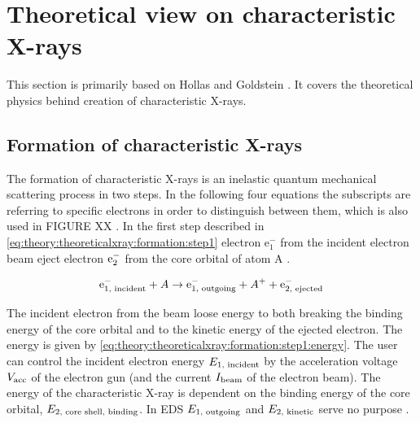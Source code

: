

\section{Theoretical view on characteristic X-rays}
\label{sec:theory:theoreticalxray}


This section is primarily based on Hollas \cite[Ch. 8.2]{hollas_modern_2004} and Goldstein \cite[Ch. 4.2]{goldstein_scanning_2018}.
It covers the theoretical physics behind creation of characteristic X-rays.

%
%
\subsection{Formation of characteristic X-rays}
\label{sec:theory:theoreticalxray:formation}
The formation of characteristic X-rays is an inelastic quantum mechanical scattering process in two steps.
In the following four equations the subscripts are referring to specific electrons in order to distinguish between them, which is also used in FIGURE XX .
In the first step described in \cref{eq:theory:theoreticalxray:formation:step1} electron e$^-_{1}$ from the incident electron beam eject electron $\textnormal{e}^-_{2}$ from the core orbital of atom A \cite[Eq. (8.12)]{hollas_modern_2004}.

\begin{equation}
    \label{eq:theory:theoreticalxray:formation:step1}
    \textnormal{e}^-_{1 \textnormal{, incident}} + A \rightarrow \textnormal{e}^-_{1 \textnormal{, outgoing}} + A^+ + \textnormal{e}^-_{2 \textnormal{, ejected}}
\end{equation}


The incident electron from the beam loose energy to both breaking the binding energy of the core orbital and to the kinetic energy of the ejected electron.
The energy is given by \cref{eq:theory:theoreticalxray:formation:step1:energy}.
The user can control the incident electron energy $E_{1 {\textnormal{, incident}}}$ by the acceleration voltage $V_{\textnormal{acc}}$ of the electron gun (and the current $I_{\textnormal{beam}}$ of the electron beam).
The energy of the characteristic X-ray is dependent on the binding energy of the core orbital, $E_{2 {\textnormal{, core shell, binding}}}$.
In EDS $E_{1 {\textnormal{, outgoing}}}$ and $E_{2 {\textnormal{, kinetic}}}$ serve no purpose \cite[Eq. (4.1)]{goldstein_scanning_2018}.

